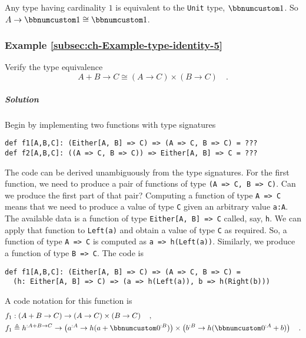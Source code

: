 Any type having cardinality $1$ is equivalent to the \lstinline!Unit!
type, $\bbnum 1$. So $A\rightarrow\bbnum 1\cong\bbnum 1$.

\subsubsection{Example \label{subsec:ch-Example-type-identity-5}\ref{subsec:ch-Example-type-identity-5}}

Verify the type equivalence 
\[
A+B\rightarrow C\cong(A\rightarrow C)\times(B\rightarrow C)\quad.
\]


\subparagraph{Solution}

Begin by implementing two functions with type signatures
\begin{lstlisting}
def f1[A,B,C]: (Either[A, B] => C) => (A => C, B => C) = ???
def f2[A,B,C]: ((A => C, B => C)) => Either[A, B] => C = ???
\end{lstlisting}
The code can be derived unambiguously from the type signatures. For
the first function, we need to produce a pair of functions of type
\lstinline!(A => C, B => C)!. Can we produce the first part of that
pair? Computing a function of type \lstinline!A => C! means that
we need to produce a value of type \lstinline!C! given an arbitrary
value \lstinline!a:A!. The available data is a function of type \lstinline!Either[A, B] => C!
called, say, \lstinline!h!. We can apply that function to \lstinline!Left(a)!
and obtain a value of type \lstinline!C! as required. So, a function
of type \lstinline!A => C! is computed as \lstinline!a => h(Left(a))!.
Similarly, we produce a function of type \lstinline!B => C!. The
code is
\begin{lstlisting}
def f1[A,B,C]: (Either[A, B] => C) => (A => C, B => C) =
  (h: Either[A, B] => C) => (a => h(Left(a)), b => h(Right(b)))
\end{lstlisting}
A code notation for this function is
\begin{align*}
 & f_{1}:\left(A+B\rightarrow C\right)\rightarrow\left(A\rightarrow C\right)\times\left(B\rightarrow C\right)\quad,\\
 & f_{1}\triangleq h^{:A+B\rightarrow C}\rightarrow\left(a^{:A}\rightarrow h(a+\bbnum 0^{:B})\right)\times\left(b^{:B}\rightarrow h(\bbnum 0^{:A}+b)\right)\quad.
\end{align*}

